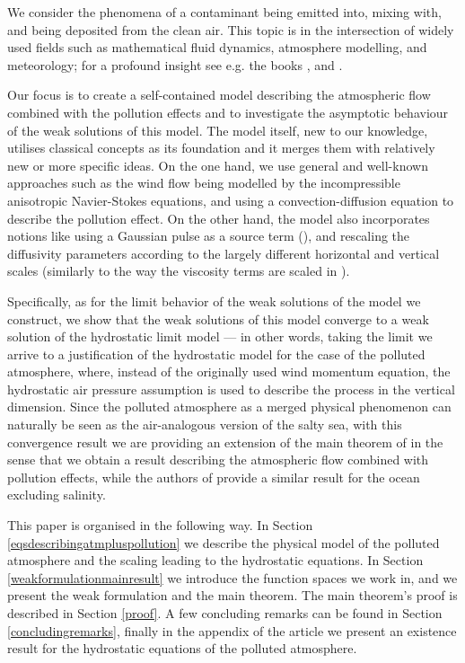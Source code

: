 \documentclass[11pt]{article}
\begin{document}
We consider the phenomena of a contaminant being emitted into, mixing with, and being deposited from the clean air. This topic is in the intersection of widely used fields such as mathematical fluid dynamics, atmosphere modelling, and meteorology; for a profound insight see e.g. the books \cite{arya2001introduction}, \cite{pedlosky2013geophysical} and \cite{temam2001navier}.

Our focus is to create a self-contained model describing the atmospheric flow combined with the pollution effects and to investigate the asymptotic behaviour of the weak solutions of this model. The model itself, new to our knowledge, utilises classical concepts as its foundation and it merges them with relatively new or more specific ideas. On the one hand, we use general and well-known approaches such as the wind flow being modelled by the incompressible anisotropic Navier-Stokes equations, and using a convection-diffusion equation to describe the pollution effect. On the other hand, the model also incorporates notions like using a Gaussian pulse as a source term (\cite{zhuk2016source}), and rescaling the diffusivity parameters according to the largely different horizontal and vertical scales (similarly to the way the viscosity terms are scaled in \cite{azerad2001mathematical}).

Specifically, as for the limit behavior of the weak solutions of the model we construct, we show that the weak solutions of this model converge to a weak solution of the hydrostatic limit model --- in other words, taking the limit we arrive to a justification of the hydrostatic model for the case of the polluted atmosphere, where, instead of the originally used wind momentum equation, the hydrostatic air pressure assumption is used to describe the process in the vertical dimension. Since the polluted atmosphere as a merged physical phenomenon can naturally be seen as the air-analogous version of the salty sea, with this convergence result we are providing an extension of the main theorem of \cite{azerad2001mathematical} in the sense that we obtain a result describing the atmospheric flow combined with pollution effects, while the authors of \cite{azerad2001mathematical} provide a similar result for the ocean excluding salinity.

This paper is organised in the following way. In Section \ref{eqsdescribingatmpluspollution} we describe the physical model of the polluted atmosphere and the scaling leading to the hydrostatic equations. In Section \ref{weakformulationmainresult} we introduce the function spaces we work in, and we present the weak formulation and the main theorem. The main theorem's proof is described in Section \ref{proof}. A few concluding remarks can be found in Section \ref{concludingremarks}, finally in the appendix of the article we present an existence result for the hydrostatic equations of the polluted atmosphere.
\end{document}
